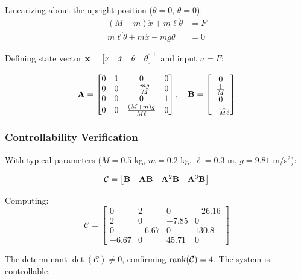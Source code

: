 Linearizing about the upright position ($\theta = 0$, $\dot{\theta} = 0$):
\begin{align}
(M + m)\ddot{x} + m\ell\ddot{\theta} &= F \\
m\ell\ddot{\theta} + m\ddot{x} - mg\theta &= 0
\end{align}

Defining state vector $\mathbf{x} = \begin{bmatrix} x & \dot{x} & \theta & \dot{\theta} \end{bmatrix}^\top$ and input $u = F$:

\begin{equation}
\mathbf{A} = \begin{bmatrix}
0 & 1 & 0 & 0 \\
0 & 0 & -\frac{mg}{M} & 0 \\
0 & 0 & 0 & 1 \\
0 & 0 & \frac{(M+m)g}{M\ell} & 0
\end{bmatrix}, \quad
\mathbf{B} = \begin{bmatrix}
0 \\
\frac{1}{M} \\
0 \\
-\frac{1}{M\ell}
\end{bmatrix}
\label{eq:pendulum_ss}
\end{equation}

\subsubsection{Controllability Verification}

With typical parameters ($M = 0.5$ kg, $m = 0.2$ kg, $\ell = 0.3$ m, $g = 9.81$ m/s$^2$):

\begin{equation}
\mathcal{C} = \begin{bmatrix} \mathbf{B} & \mathbf{A}\mathbf{B} & \mathbf{A}^2\mathbf{B} & \mathbf{A}^3\mathbf{B} \end{bmatrix}
\end{equation}

Computing:
\begin{equation}
\mathcal{C} = \begin{bmatrix}
0 & 2 & 0 & -26.16 \\
2 & 0 & -7.85 & 0 \\
0 & -6.67 & 0 & 130.8 \\
-6.67 & 0 & 45.71 & 0
\end{bmatrix}
\end{equation}

The determinant $\det(\mathcal{C}) \neq 0$, confirming $\operatorname{rank}(\mathcal{C}) = 4$. The system is controllable.

